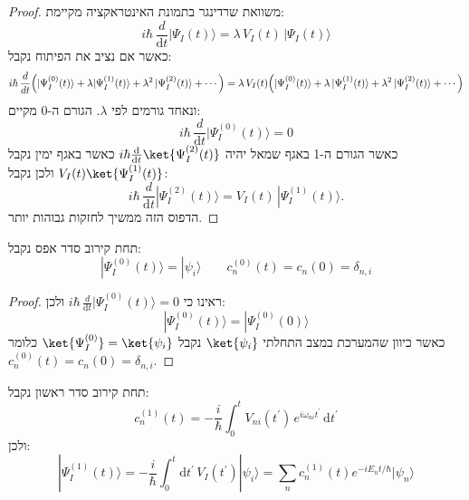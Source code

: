 \documentclass{tstextbook}
\begin{document}
\begin{proof}
משוואת שרדינגר בתמונת האינטראקציה מקיימת:
$$i\hbar\,\frac{d}{\mathrm{d} t}|\Psi_{I}(t)\rangle=\lambda\,V_{I}(t)\,|\Psi_{I}(t)\rangle$$
כאשר אם נציב את הפיתוח נקבל:
$$i\hbar\,\frac{d}{dt}\Big{(}|\Psi_{I}^{(0)}(t)\rangle+\lambda|\Psi_{I}^{(1)}(t)\rangle+\lambda^{2}\,|\Psi_{I}^{(2)}(t)\rangle+\cdots\Big{)}=\lambda\,V_{I}(t)\Big{(}|\Psi_{I}^{(0)}(t)\rangle+\lambda\,|\Psi_{I}^{(1)}(t)\rangle+\lambda^{2}\,|\Psi_{I}^{(2)}(t)\rangle+\cdots\Big{)}$$
ונאחד גורמים לפי \(\lambda\). הגורם ה-0 מקיים:
$$i\hbar\,\frac{d}{\mathrm{d} t}|\Psi_{I}^{(0)}(t)\rangle=0$$
כאשר הגורם ה-1 באגף שמאל יהיה \(i\hbar \frac{\mathrm{d} }{\mathrm{d} t}\ket{\Psi_{I}^{(2)}(t)}\) כאשר באגף ימין נקבל \(V_{I}(t)\ket{\Psi_{I}^{(1)}(t)}\) ולכן נקבל:
$$i\hbar\,\frac{d}{\mathrm{d} t}|\Psi_{I}^{(2)}(t)\rangle=V_{I}(t)\,|\Psi_{I}^{(1)}(t)\rangle.$$
הדפוס הזה ממשיך לחזקות גבוהות יותר.

\end{proof}
\begin{proposition}
תחת קירוב סדר אפס נקבל:
$$|\Psi_{I}^{(0)}(t)\rangle=|\psi_{i}\rangle \qquad c_{n}^{(0)}(t)=c_{n}(0)=\delta_{n,i}$$

\end{proposition}
\begin{proof}
ראינו כי \(i\hbar\,\frac{d}{\mathrm{d} t}|\Psi_{I}^{(0)}(t)\rangle=0\) ולכן:
$$|\Psi_{I}^{(0)}(t)\rangle=|\Psi_{I}^{(0)}(0)\rangle$$
כאשר כיוון שהמערכת במצב התחלתי \(\ket{\psi_{i}}\) נקבל \(\ket{\Psi_{I}^{(0)}}=\ket{\psi_{i}}\) כלומר \(c_{n}^{(0)}(t)=c_{n}(0)=\delta_{n,i}\).

\end{proof}
\begin{proposition}
תחת קירוב סדר ראשון נקבל:
$$c_{n}^{(1)}(t)=-\frac{i}{\hbar}\int_{0}^{t}V_{n i}\left( t^{\prime} \right)\,e^{i\omega_{n i}t^{\prime}}\,\mathrm{d} t^{\prime}$$
ולכן:
$$|\Psi_{I}^{(1)}(t)\rangle=-\frac{i}{\hbar}\int_{0}^{t}\mathrm{d} t^{\prime}\,V_{I}(t^{\prime})|\psi_{i}\rangle=\sum_{n}c_{n}^{(1)}(t)e^{-i E_{n}t/\hbar}|\psi_{n}\rangle$$

\end{proposition}
\end{document}
